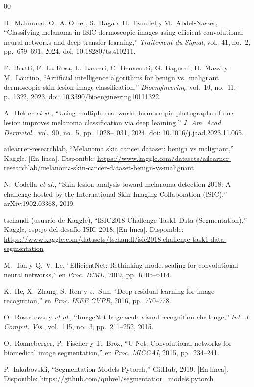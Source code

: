 \documentclass[conference]{IEEEtran}
\begin{document}
	\begin{thebibliography}{00}
		
		H.~Mahmoud, O.~A. Omer, S.~Ragab, H.~Esmaiel y M.~Abdel-Nasser, ``Classifying melanoma in ISIC dermoscopic images using efficient convolutional neural networks and deep transfer learning,'' \textit{Traitement du Signal}, vol.~41, no.~2, pp.~679--691, 2024, doi: 10.18280/ts.410211.
		
		F.~Brutti, F.~La Rosa, L.~Lazzeri, C.~Benvenuti, G.~Bagnoni, D.~Massi y M.~Laurino, ``Artificial intelligence algorithms for benign vs.\ malignant dermoscopic skin lesion image classification,'' \textit{Bioengineering}, vol.~10, no.~11, p.~1322, 2023, doi: 10.3390/bioengineering10111322.
		
		A.~Hekler \textit{et al.}, ``Using multiple real-world dermoscopic photographs of one lesion improves melanoma classification via deep learning,'' \textit{J. Am. Acad. Dermatol.}, vol.~90, no.~5, pp.~1028--1031, 2024, doi: 10.1016/j.jaad.2023.11.065.
		
		ailearner-researchlab, ``Melanoma skin cancer dataset: benign vs malignant,'' Kaggle. [En línea]. Disponible: \url{https://www.kaggle.com/datasets/ailearner-researchlab/melanoma-skin-cancer-dataset-benign-vs-malignant}
		
		N.~Codella \textit{et al.}, ``Skin lesion analysis toward melanoma detection 2018: A challenge hosted by the International Skin Imaging Collaboration (ISIC),'' arXiv:1902.03368, 2019.
		
		tschandl (usuario de Kaggle), ``ISIC2018 Challenge Task1 Data (Segmentation),'' Kaggle, espejo del desafío ISIC 2018. [En línea]. Disponible: \url{https://www.kaggle.com/datasets/tschandl/isic2018-challenge-task1-data-segmentation}
		
		M.~Tan y Q.~V. Le, ``EfficientNet: Rethinking model scaling for convolutional neural networks,'' en \textit{Proc. ICML}, 2019, pp.~6105--6114.
		
		K.~He, X.~Zhang, S.~Ren y J.~Sun, ``Deep residual learning for image recognition,'' en \textit{Proc. IEEE CVPR}, 2016, pp.~770--778.
		
		O.~Russakovsky \textit{et al.}, ``ImageNet large scale visual recognition challenge,'' \textit{Int. J. Comput. Vis.}, vol.~115, no.~3, pp.~211--252, 2015.
		
		O.~Ronneberger, P.~Fischer y T.~Brox, ``U-Net: Convolutional networks for biomedical image segmentation,'' en \textit{Proc. MICCAI}, 2015, pp.~234--241.
		
		P.~Iakubovskii, ``Segmentation Models Pytorch,'' GitHub, 2019. [En línea]. Disponible: \url{https://github.com/qubvel/segmentation_models.pytorch}
		
	\end{thebibliography}
	
\end{document}
